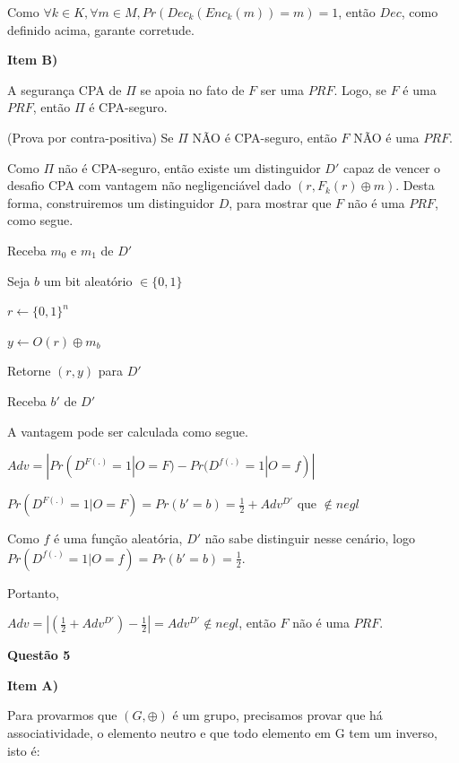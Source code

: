\documentclass{article}
\begin{document}
    Como $\forall k \in K, \forall m \in M, Pr(Dec_k(Enc_k(m)) = m) = 1$, então $Dec$, como definido acima, garante corretude.

\textbf{Item B)}

    A segurança CPA de $\Pi$ se apoia no fato de $F$ ser uma $PRF$. Logo, se $F$ é uma $PRF$, então $\Pi$ é CPA-seguro.

    (Prova por contra-positiva) Se $\Pi$ NÃO é CPA-seguro, então $F$ NÃO é uma $PRF$.

    Como $\Pi$ não é CPA-seguro, então existe um distinguidor $D'$ capaz de vencer o desafio CPA com vantagem não negligenciável dado $(r, F_k(r) \oplus m)$. Desta forma, construiremos um distinguidor $D$, para mostrar que $F$ não é uma $PRF$, como segue. 

    \begin{algorithm}[H]
        \caption{Distinguidor D}

        Receba $m_0$ e $m_1$ de $D'$

        Seja $b$ um bit aleatório $\in \{0,1\}$

        $r \leftarrow \{0,1\}^n$

        $y \leftarrow O(r) \oplus m_b$

        Retorne $(r,y)$ para $D'$

        Receba $b'$ de $D'$

    \end{algorithm}

    A vantagem pode ser calculada como segue.

    $Adv = |Pr(D^{F(.)} = 1 | O = F) - Pr(D^{f(.)} = 1 | O = f)|$

    $Pr(D^{F(.)} = 1 | O = F) = Pr(b' = b) = \frac{1}{2} + Adv^{D'}$ que $\notin negl$

    Como $f$ é uma função aleatória, $D'$ não sabe distinguir nesse cenário, logo $Pr(D^{f(.)} = 1 | O = f) = Pr(b' = b) = \frac{1}{2}$.

    Portanto,

    $Adv = |(\frac{1}{2} + Adv^{D'})  - \frac{1}{2}| = Adv^{D'} \notin negl$, então $F$ não é uma $PRF$.

\newpage

\textbf{Questão 5}

\textbf{Item A)}

    Para provarmos que $(G,\oplus)$ é um grupo, precisamos provar que há associatividade, o elemento neutro e que todo elemento em G tem um inverso, isto é:
\end{document}
